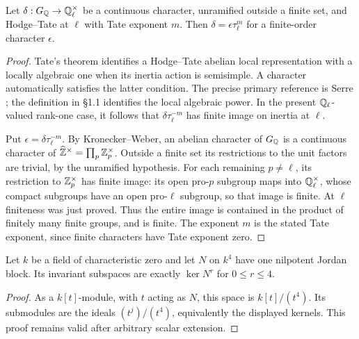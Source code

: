 \begin{lemma}\label{irr:rankone}
Let $\delta:G_\mathbb Q\to\mathbb Q_\ell^\times$ be a continuous character, unramified
outside a finite set, and Hodge--Tate at $\ell$ with Tate exponent $m$.
Then $\delta=\epsilon\tau_\ell^m$ for a finite-order character $\epsilon$.
\end{lemma}
\begin{proof}
Tate's theorem identifies a Hodge--Tate abelian local representation with
a locally algebraic one when its inertia action is semisimple. A character
automatically satisfies the latter condition. The precise primary reference
is Serre \cite[Chapter~III, \S1.2, Theorem (Tate), printed p.~III-7;
proof in the Appendix to Chapter~III]{SerreRankOne}; the definition in \S1.1
identifies the local algebraic power. In the present $\mathbb Q_\ell$-valued
rank-one case, it follows that $\delta\tau_\ell^{-m}$ has finite image
on inertia at $\ell$.

Put $\epsilon=\delta\tau_\ell^{-m}$. By Kronecker--Weber, an abelian
character of $G_\mathbb Q$ is a continuous character of
$\widehat{\mathbb Z}^\times=\prod_p\mathbb Z_p^\times$. Outside a finite set its
restrictions to the unit factors are trivial, by the unramified hypothesis.
For each remaining $p\ne\ell$, its restriction to $\mathbb Z_p^\times$ has
finite image: its open pro-$p$ subgroup maps into $\mathbb Q_\ell^\times$,
whose compact subgroups have an open pro-$\ell$ subgroup, so that image
is finite. At $\ell$ finiteness was just proved. Thus the entire image is
contained in the product of finitely many finite groups, and is finite.
The exponent $m$ is the stated Tate exponent, since finite characters
have Tate exponent zero.
\end{proof}

\begin{lemma}\label{irr:flag}
Let $k$ be a field of characteristic zero and let $N$ on $k^4$ have one
nilpotent Jordan block. Its invariant subspaces are exactly
$\ker N^r$ for $0\le r\le4$.
\end{lemma}
\begin{proof}
As a $k[t]$-module, with $t$ acting as $N$, this space is
$k[t]/(t^4)$. Its submodules are the ideals $(t^j)/(t^4)$,
equivalently the displayed kernels. This proof remains valid after
arbitrary scalar extension.
\end{proof}

